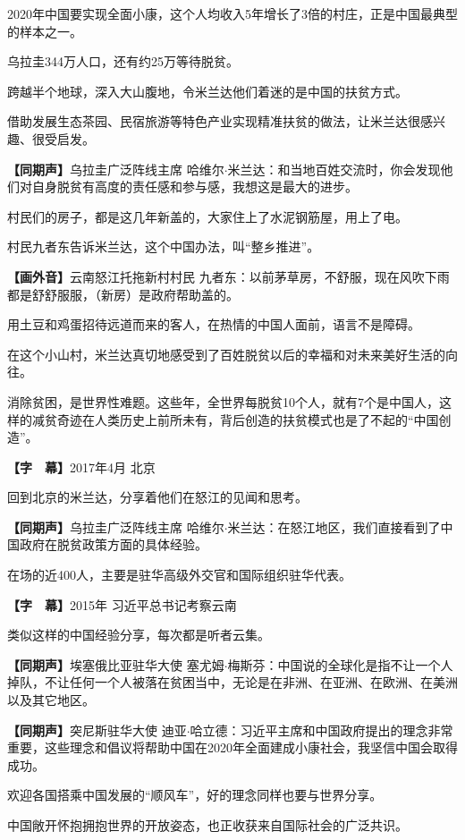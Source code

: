 \documentclass{ctexart}
\newcommand{\zkh}[1]{\textbf{\hspace{-2.7em} 【#1】}}
\begin{document}
2020年中国要实现全面小康，这个人均收入5年增长了3倍的村庄，正是中国最典型的样本之一。

乌拉圭344万人口，还有约25万等待脱贫。

跨越半个地球，深入大山腹地，令米兰达他们着迷的是中国的扶贫方式。

借助发展生态茶园、民宿旅游等特色产业实现精准扶贫的做法，让米兰达很感兴趣、很受启发。

\zkh{同期声}乌拉圭广泛阵线主席 哈维尔\textbf{$\cdot $}米兰达：和当地百姓交流时，你会发现他们对自身脱贫有高度的责任感和参与感，我想这是最大的进步。

村民们的房子，都是这几年新盖的，大家住上了水泥钢筋屋，用上了电。

村民九者东告诉米兰达，这个中国办法，叫``整乡推进''。

\zkh{画外音}云南怒江托拖新村村民 九者东：以前茅草房，不舒服，现在风吹下雨都是舒舒服服，（新房）是政府帮助盖的。

用土豆和鸡蛋招待远道而来的客人，在热情的中国人面前，语言不是障碍。

在这个小山村，米兰达真切地感受到了百姓脱贫以后的幸福和对未来美好生活的向往。

消除贫困，是世界性难题。这些年，全世界每脱贫10个人，就有7个是中国人，这样的减贫奇迹在人类历史上前所未有，背后创造的扶贫模式也是了不起的``中国创造''。

\zkh{字　幕}2017年4月 北京

回到北京的米兰达，分享着他们在怒江的见闻和思考。

\zkh{同期声}乌拉圭广泛阵线主席 哈维尔\textbf{$\cdot $}米兰达：在怒江地区，我们直接看到了中国政府在脱贫政策方面的具体经验。

在场的近400人，主要是驻华高级外交官和国际组织驻华代表。

\zkh{字　幕}2015年 习近平总书记考察云南

类似这样的中国经验分享，每次都是听者云集。

\zkh{同期声}埃塞俄比亚驻华大使 塞尤姆\textbf{$\cdot $}梅斯芬：中国说的全球化是指不让一个人掉队，不让任何一个人被落在贫困当中，无论是在非洲、在亚洲、在欧洲、在美洲以及其它地区。

\zkh{同期声}突尼斯驻华大使 迪亚\textbf{$\cdot $}哈立德：习近平主席和中国政府提出的理念非常重要，这些理念和倡议将帮助中国在2020年全面建成小康社会，我坚信中国会取得成功。

欢迎各国搭乘中国发展的``顺风车''，好的理念同样也要与世界分享。

中国敞开怀抱拥抱世界的开放姿态，也正收获来自国际社会的广泛共识。
\end{document}
